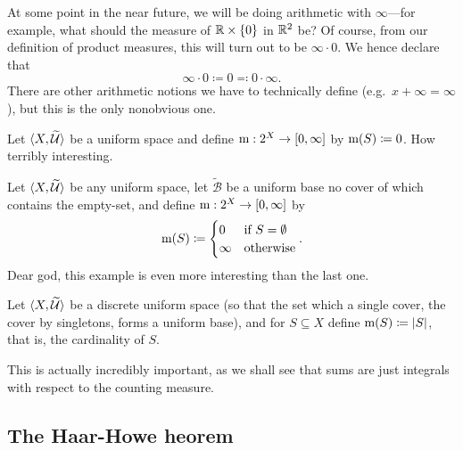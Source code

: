 \begin{displayquote}
At some point in the near future, we will be doing arithmetic with $\infty$---for example, what should the measure of $\mathbb{R} \times \{ 0\}$ in $\mathbb{R} ^2$ be?  Of course, from our definition of product measures, this will turn out to be $\infty \cdot 0$.  We hence declare that
\begin{equation}
\infty \cdot 0\coloneqq 0\eqqcolon 0\cdot \infty .
\end{equation}
There are other arithmetic notions we have to technically define (e.g.~$x+\infty=\infty$), but this is the only nonobvious one.
\end{displayquote}

\begin{exm}
Let $\langle X,\widetilde{\mathcal{U}}\rangle$ be a uniform space and define $\mathrm{m} :2^X\rightarrow [0,\infty ]$ by $\mathrm{m} (S)\coloneqq 0$.  How terribly interesting.
\end{exm}
\begin{exm}
Let $\langle X,\widetilde{\mathcal{U}}\rangle$ be any uniform space, let $\widetilde{\mathcal{B}}$ be a uniform base no cover of which contains the empty-set, and define $\mathrm{m} :2^X\rightarrow [0,\infty ]$ by
\begin{equation}
\mathrm{m} (S)\coloneqq \begin{cases}0 & \text{if }S=\emptyset \\ \infty & \text{otherwise}\end{cases}.
\end{equation}
Dear god, this example is even more interesting than the last one.
\end{exm}
\begin{exm}
Let $\langle X,\widetilde{\mathcal{U}}\rangle$ be a discrete uniform space (so that the set which a single cover, the cover by singletons, forms a uniform base), and for $S\subseteq X$ define $\mathrm{m} (S)\coloneqq \lvert S\rvert$, that is, the cardinality of $S$.
\begin{rmk}
This is actually incredibly important, as we shall see that sums are just integrals with respect to the counting measure.
\end{rmk}
\end{exm}

\subsection{The Haar-Howe heorem}

